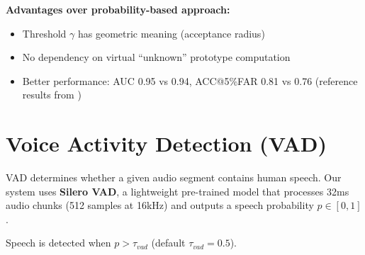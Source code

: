\documentclass[12pt,a4paper]{report}
\begin{document}
\begin{center}
\end{center}

\textbf{Advantages over probability-based approach:}
\begin{itemize}
    \item Threshold $\gamma$ has geometric meaning (acceptance radius)
    \item No dependency on virtual ``unknown'' prototype computation
    \item Better performance: AUC 0.95 vs 0.94, ACC@5\%FAR 0.81 vs 0.76
          (reference results from \cite{binh2025})
\end{itemize}


\section{Voice Activity Detection (VAD)}

VAD determines whether a given audio segment contains human speech. Our
system uses \textbf{Silero VAD}, a lightweight pre-trained model that
processes 32ms audio chunks (512 samples at 16kHz) and outputs a speech
probability $p \in [0, 1]$.

Speech is detected when $p > \tau_{vad}$ (default $\tau_{vad} = 0.5$).
\end{document}
